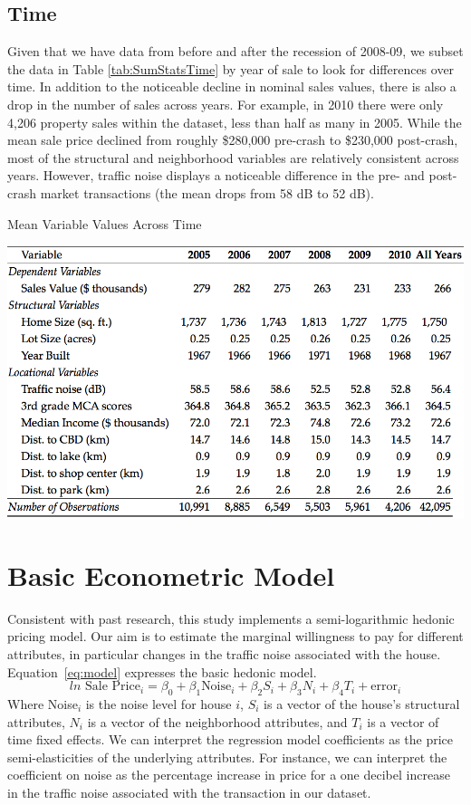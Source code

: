 \documentclass{article}\usepackage{graphicx, color}
\begin{document}
\subsection{Time}
Given that we have data from before and after the recession of 2008-09, we subset the data in Table \ref{tab:SumStatsTime} by year of sale to look for differences over time. In addition to the noticeable decline in nominal sales values, there is also a drop in the number of sales across years. For example, in 2010 there were only 4,206 property sales within the dataset, less than half as many in 2005. While the mean sale price declined from roughly \$280,000 pre-crash to \$230,000 post-crash, most of the structural and neighborhood variables are relatively consistent across years. However, traffic noise displays a noticeable difference in the pre- and post-crash market transactions (the mean drops from 58 dB to 52 dB). 

\begin{table}
\caption{Mean Variable Values Across Time}\label{tab:SumStatsTime}
\includegraphics[width = \textwidth]{../graphs/DescriptiveStatsByYear}
\end{table}

\section{Basic Econometric Model}\label{basicModel}
Consistent with past research, this study implements a semi-logarithmic hedonic pricing model. Our aim is to estimate the marginal willingness to pay for different attributes, in particular changes in the traffic noise associated with the house. Equation~\eqref{eq:model} expresses the basic hedonic model.
\begin{equation}\label{eq:model}	
ln \textrm{ Sale Price}_i = \beta _0 + \beta _1 \textrm{Noise}_i+ \beta _2 S_i+ \beta _3 N_i + \beta _4 T_i + \textrm{error}_i
\end{equation}
Where Noise$_i$ is the noise level for house $i$, $S_i$ is a vector of the house's structural attributes, $N_i$ is a vector of the neighborhood attributes, and $T_i$ is a vector of time fixed effects. We can interpret the regression model coefficients as the price semi-elasticities of the underlying attributes. For instance, we can interpret the coefficient on noise as the percentage increase in price for a one decibel increase in the traffic noise associated with the transaction in our dataset. 
\end{document}
